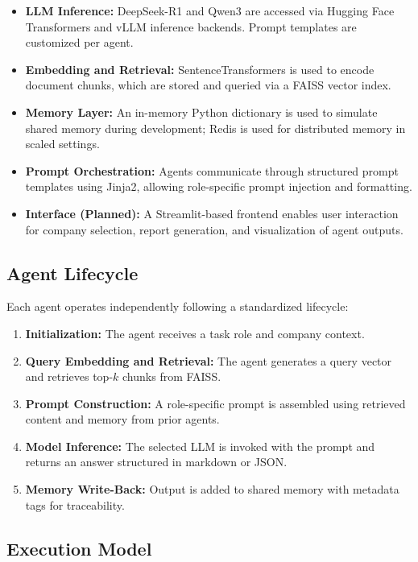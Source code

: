 \documentclass[11pt]{article}
\begin{document}
\begin{itemize}
    \item \textbf{LLM Inference:} DeepSeek-R1 and Qwen3 are accessed via Hugging Face Transformers and vLLM inference backends. Prompt templates are customized per agent.
    \item \textbf{Embedding and Retrieval:} SentenceTransformers is used to encode document chunks, which are stored and queried via a FAISS vector index.
    \item \textbf{Memory Layer:} An in-memory Python dictionary is used to simulate shared memory during development; Redis is used for distributed memory in scaled settings.
    \item \textbf{Prompt Orchestration:} Agents communicate through structured prompt templates using Jinja2, allowing role-specific prompt injection and formatting.
    \item \textbf{Interface (Planned):} A Streamlit-based frontend enables user interaction for company selection, report generation, and visualization of agent outputs.
\end{itemize}

\subsection*{Agent Lifecycle}

Each agent operates independently following a standardized lifecycle:

\begin{enumerate}
    \item \textbf{Initialization:} The agent receives a task role and company context.
    \item \textbf{Query Embedding and Retrieval:} The agent generates a query vector and retrieves top-$k$ chunks from FAISS.
    \item \textbf{Prompt Construction:} A role-specific prompt is assembled using retrieved content and memory from prior agents.
    \item \textbf{Model Inference:} The selected LLM is invoked with the prompt and returns an answer structured in markdown or JSON.
    \item \textbf{Memory Write-Back:} Output is added to shared memory with metadata tags for traceability.
\end{enumerate}

\subsection*{Execution Model}
\end{document}
